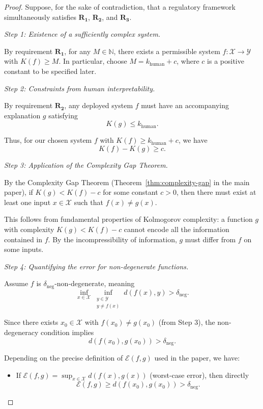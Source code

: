 \documentclass[11pt,letter,leqno]{article}
\begin{document}
\begin{proof}
Suppose, for the sake of contradiction, that a regulatory framework simultaneously 
satisfies $\mathbf{R_1}$, $\mathbf{R_2}$, and $\mathbf{R_3}$.

\textit{Step 1: Existence of a sufficiently complex system.}

By requirement $\mathbf{R_1}$, for any $M \in \mathbb{N}$, there exists a permissible 
system $f: \mathcal{X} \to \mathcal{Y}$ with $K(f) \geq M$. In particular, choose 
$M = k_{\text{human}} + c$, where $c$ is a positive constant to be specified later.

\textit{Step 2: Constraints from human interpretability.}

By requirement $\mathbf{R_2}$, any deployed system $f$ must have an accompanying 
explanation $g$ satisfying
\[
K(g) \leq k_{\text{human}}.
\]

Thus, for our chosen system $f$ with $K(f) \geq k_{\text{human}} + c$, we have
\[
K(f) - K(g) \geq c.
\]

\textit{Step 3: Application of the Complexity Gap Theorem.}

By the Complexity Gap Theorem (Theorem~\ref{thm:complexity-gap} in the main paper), 
if $K(g) < K(f) - c$ for some constant $c > 0$, then there must exist at least 
one input $x \in \mathcal{X}$ such that $f(x) \neq g(x)$.

This follows from fundamental properties of Kolmogorov complexity: a function $g$ 
with complexity $K(g) < K(f) - c$ cannot encode all the information contained in 
$f$. By the incompressibility of information, $g$ must differ from $f$ on some 
inputs.

\textit{Step 4: Quantifying the error for non-degenerate functions.}

Assume $f$ is $\delta_{\text{neg}}$-non-degenerate, meaning
\[
\inf_{x \in \mathcal{X}} \inf_{\substack{y \in \mathcal{Y} \\ y \neq f(x)}} 
d(f(x), y) > \delta_{\text{neg}}.
\]

Since there exists $x_0 \in \mathcal{X}$ with $f(x_0) \neq g(x_0)$ (from Step 3), 
the non-degeneracy condition implies
\[
d(f(x_0), g(x_0)) > \delta_{\text{neg}}.
\]

Depending on the precise definition of $\mathcal{E}(f,g)$ used in the paper, we have:

\begin{itemize}
\item If $\mathcal{E}(f,g) = \sup_{x \in \mathcal{X}} d(f(x), g(x))$ (worst-case 
error), then directly
\[
\mathcal{E}(f,g) \geq d(f(x_0), g(x_0)) > \delta_{\text{neg}}.
\]


\end{itemize}
\end{proof}
\end{document}
